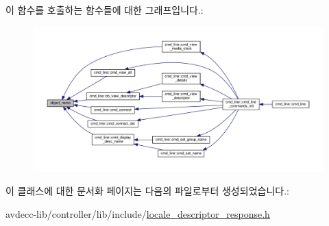 이 함수를 호출하는 함수들에 대한 그래프입니다.\+:
\nopagebreak
\begin{figure}[H]
\begin{center}
\leavevmode
\includegraphics[width=350pt]{classavdecc__lib_1_1descriptor__response__base_a133f7774946d80f82b8aaaa4cfbb7361_icgraph}
\end{center}
\end{figure}




이 클래스에 대한 문서화 페이지는 다음의 파일로부터 생성되었습니다.\+:\begin{DoxyCompactItemize}
\item 
avdecc-\/lib/controller/lib/include/\hyperlink{locale__descriptor__response_8h}{locale\+\_\+descriptor\+\_\+response.\+h}\end{DoxyCompactItemize}
